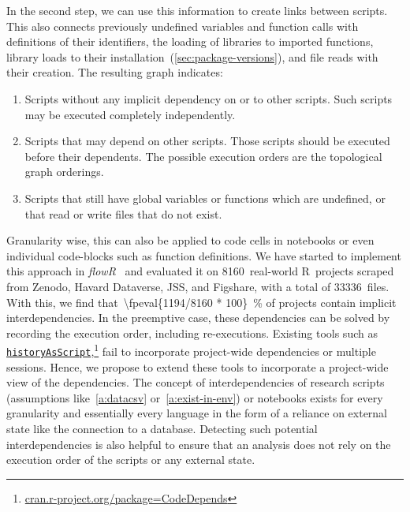 In the second step, we can use this information to create links between scripts. %
This also connects previously undefined variables and function calls with definitions of their identifiers, the loading of libraries to imported  functions, library loads to their installation~(\ref{sec:package-versions}), and file reads with their creation.
The resulting graph indicates: 
\begin{enumerate}[nosep,leftmargin=*]
  \item Scripts without any implicit dependency on or to other scripts. Such scripts may be executed completely independently.
  \item Scripts that may depend on other scripts. Those scripts should be executed before their dependents. The possible execution orders are the topological graph orderings.
  \item Scripts that still have global variables or functions which are undefined, or that read or write files that do not exist. %
\end{enumerate}
Granularity wise, this can also be applied to code cells in notebooks or even individual code-blocks such as function definitions.
We have started to implement this approach in \textit{flowR}~\cite{floopsla} and evaluated it on \num{8160}~real-world R~projects scraped from Zenodo, Havard Dataverse, JSS, and Figshare, with a total of \num{33336}~files. With this, we find that~\qty[round-precision=1]{\fpeval{1194/8160 * 100}}{\percent} of projects contain implicit interdependencies. %
In the preemptive case, these dependencies can be solved by recording the execution order, including re-executions.
Existing tools such as \texttt{\href{https://rdrr.io/cran/CodeDepends/man/historyAsScript.html}{history\-As\-Script}},\footnote{\href{https://cran.r-project.org/package=CodeDepends}{cran.r-project.org/package=CodeDepends}} fail to incorporate project-wide dependencies or multiple sessions.
Hence, we propose to extend these tools to incorporate a project-wide view of the dependencies.
The concept of interdependencies of research scripts (assumptions like~\ref{a:datacsv}
or~\ref{a:exist-in-env}) or notebooks exists for every granularity and essentially every language in the form of a reliance on external state like the connection to a database. %
Detecting such potential interdependencies is also helpful to ensure that an analysis does not rely on the execution order of the scripts or any external state. 
